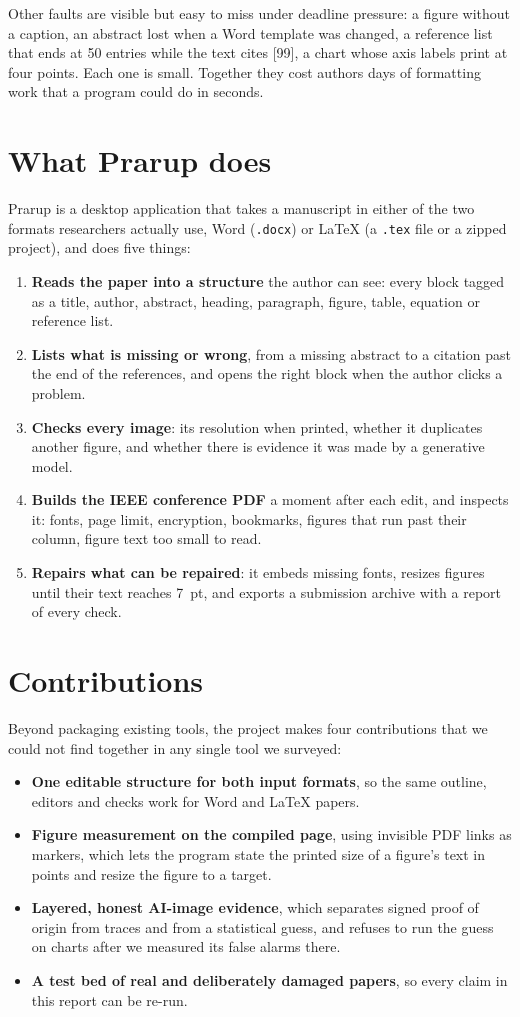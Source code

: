 \documentclass[11pt,a4paper,oneside,openany]{book}
\newcommand{\code}[1]{\texttt{#1}}
\begin{document}
Other faults are visible but easy to miss under deadline pressure: a figure without a caption, an abstract
lost when a Word template was changed, a reference list that ends at 50 entries while the text cites
[99], a chart whose axis labels print at four points. Each one is small. Together they cost authors days
of formatting work that a program could do in seconds.

\section{What Prarup does}
Prarup is a desktop application that takes a manuscript in either of the two formats researchers actually
use, Word (\code{.docx}) or \LaTeX{} (a \code{.tex} file or a zipped project), and does five things:
\begin{enumerate}
\item \textbf{Reads the paper into a structure} the author can see: every block tagged as a title, author,
abstract, heading, paragraph, figure, table, equation or reference list.
\item \textbf{Lists what is missing or wrong}, from a missing abstract to a citation past the end of the
references, and opens the right block when the author clicks a problem.
\item \textbf{Checks every image}: its resolution when printed, whether it duplicates another figure, and
whether there is evidence it was made by a generative model.
\item \textbf{Builds the IEEE conference PDF} a moment after each edit, and inspects it: fonts, page limit,
encryption, bookmarks, figures that run past their column, figure text too small to read.
\item \textbf{Repairs what can be repaired}: it embeds missing fonts, resizes figures until their text
reaches 7~pt, and exports a submission archive with a report of every check.
\end{enumerate}

\section{Contributions}
Beyond packaging existing tools, the project makes four contributions that we could not find together in
any single tool we surveyed:
\begin{itemize}
\item \textbf{One editable structure for both input formats}, so the same outline, editors and checks work
for Word and \LaTeX{} papers.
\item \textbf{Figure measurement on the compiled page}, using invisible PDF links as markers, which lets the
program state the printed size of a figure's text in points and resize the figure to a target.
\item \textbf{Layered, honest AI-image evidence}, which separates signed proof of origin from traces and
from a statistical guess, and refuses to run the guess on charts after we measured its false alarms there.
\item \textbf{A test bed of real and deliberately damaged papers}, so every claim in this report can be
re-run.
\end{itemize}
\end{document}
